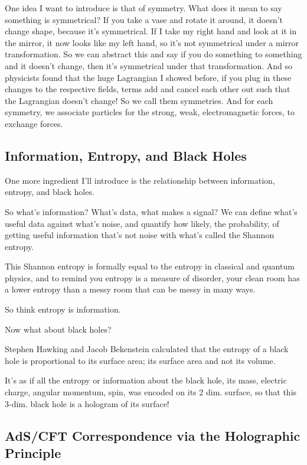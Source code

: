 \documentclass[10pt]{amsart}
\begin{document}
One idea I want to introduce is that of symmetry. What does it mean to say something is symmetrical? If you take a vase and rotate it around, it doesn't change shape, because it's symmetrical. If I take my right hand and look at it in the mirror, it now looks like my left hand, so it's not symmetrical under a mirror transformation. So we can abstract this and say if you do something to something and it doesn't change, then it's symmetrical under that transformation. And so physicists found that the huge Lagrangian I showed before, if you plug in these changes to the respective fields, terms add and cancel each other out such that the Lagrangian doesn't change! So we call them symmetries. And for each symmetry, we associate particles for the strong, weak, electromagnetic forces, to exchange forces.

\subsection{Information, Entropy, and Black Holes}

One more ingredient I'll introduce is the relationship between information, entropy, and black holes. 

So what's information? What's data, what makes a signal? We can define what's useful data against what's noise, and quantify how likely, the probability, of getting useful information that's not noise with what's called the Shannon entropy. 

This Shannon entropy is formally equal to the entropy in classical and quantum physics, and to remind you entropy is a measure of disorder, your clean room has a lower entropy than a messy room that can be messy in many ways.

So think entropy is information.

Now what about black holes?

Stephen Hawking and Jacob Bekenstein calculated that the entropy of a black hole is proportional to its surface area; its surface area and not its volume.

It's as if all the entropy or information about the black hole, its mass, electric charge, angular momentum, spin, was encoded on its 2 dim. surface, so that this 3-dim. black hole is a hologram of its surface!

\subsection{AdS/CFT Correspondence via the Holographic Principle}
\end{document}
